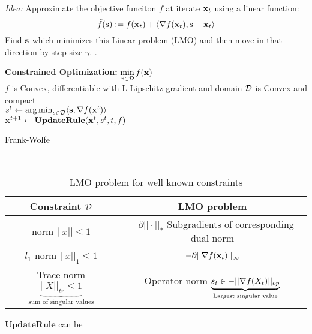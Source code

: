 \documentclass[summaries.tex]{subfiles}
\begin{document}
 \INPROGRESS
\cite{jaggi2013revisiting} \cite{pedregosa2018frank} 
\cite{pedregosa2018step} \cite{Demyanov70}
\emph{Idea:} Approximate the objective funciton $f$ at iterate $\mathbf{x}_t$ using
a linear function:
\begin{equation*}
  \tilde{f}(\mathbf{s}) := f(\mathbf{x}_t) + \langle \nabla f(\mathbf{x}_t), \mathbf{s} - \mathbf{x}_t \rangle
\end{equation*}
Find $\mathbf{s}$ which minimizes this Linear problem (LMO) and then move in that
direction by step size $\gamma$. .
\begin{algorithm}[h]
  \textbf{Constrained Optimization:} $\min\limits_{x \in \mathcal{D}} f(\mathbf{x})$ \\
  $f$ is Convex, differentiable with L-Lipschitz gradient and domain $\mathcal{D}$
  is Convex and compact \\
   {
    $s^t \gets \operatorname*{arg\,min}_{s \in \mathcal{D}}\langle \mathbf{s}, \nabla f(\mathbf{x}^{t}) \rangle$ \\
    $\mathbf{x}^{t + 1} \gets \mathbf{UpdateRule}(\mathbf{x}^t, s^t, t, f)$
  }
  \caption{Frank-Wolfe}
  \label{alg:fw}
\end{algorithm}
\\
\begin{table}[]
  \centering
  \parbox{\linewidth}{
    \begin{tabular}{|c|c|}
      Constraint $\mathcal{D}$ & LMO problem  \\
      \hline
      norm $||x|| \leq 1$ & $-\partial ||\cdot||_{*}$ Subgradients of corresponding
      dual norm \\
      $l_1$ norm $||x||_{1} \leq 1$ & $-\partial ||\nabla f(\mathbf{x}_t)||_{\infty}$ \\
      Trace norm $\underbrace{||X||_{tr} \leq 1}_{\text{sum of singular values}}$
                                    & Operator norm
                                    $\underbrace{s_t \in -||\nabla f(X_t) ||_{op}}_{\text{Largest singular value}}$\\
    \end{tabular}
    \caption{LMO problem for well known constraints}
    \label{tab:lmo}
  }  
\end{table}
$\mathbf{UpdateRule}$ can be
\end{document}
